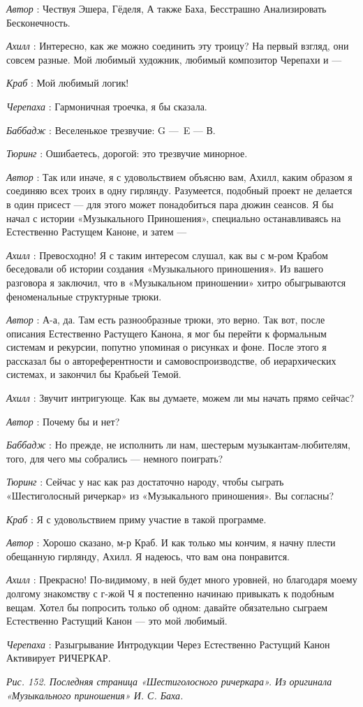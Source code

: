 \documentclass[../main.tex]{subfiles}
\begin{document}
\begin{dialogue}
\emph{Автор} : Чествуя Эшера, Гёделя, А также Баха, Бесстрашно Анализировать Бесконечность.

\emph{Ахилл} : Интересно, как же можно соединить эту троицу? На первый взгляд, они совсем разные. Мой любимый художник, любимый композитор Черепахи и ---

\emph{Краб} : Мой любимый логик!

\emph{Черепаха} : Гармоничная троечка, я бы сказала.

\emph{Баббадж} : Веселенькое трезвучие: G ---~E --- В.

\emph{Тюринг} : Ошибаетесь, дорогой: это трезвучие минорное.

\emph{Автор} : Так или иначе, я с удовольствием объясню вам, Ахилл, каким образом я соединяю всех троих в одну гирлянду. Разумеется, подобный проект не делается в один присест --- для этого может понадобиться пара дюжин сеансов. Я бы начал с истории «Музыкального Приношения», специально останавливаясь на Естественно Растущем Каноне, и затем ---

\emph{Ахилл} : Превосходно! Я с таким интересом слушал, как вы с м-ром Крабом беседовали об истории создания «Музыкального приношения». Из вашего разговора я заключил, что в «Музыкальном приношении» хитро обыгрываются феноменальные структурные трюки.

\emph{Автор} : А-а, да. Там есть разнообразные трюки, это верно. Так вот, после описания Естественно Растущего Канона, я мог бы перейти к формальным системам и рекурсии, попутно упоминая о рисунках и фоне. После этого я рассказал бы о автореферентности и самовоспроизводстве, об иерархических системах, и закончил бы Крабьей Темой.

\emph{Ахилл} : Звучит интригующе. Как вы думаете, можем ли мы начать прямо сейчас?

\emph{Автор} : Почему бы и нет?

\emph{Баббадж} : Но прежде, не исполнить ли нам, шестерым музыкантам-любителям, того, для чего мы собрались --- немного поиграть?

\emph{Тюринг} : Сейчас у нас как раз достаточно народу, чтобы сыграть «Шестиголосный ричеркар» из «Музыкального приношения». Вы согласны?

\emph{Краб} : Я с удовольствием приму участие в такой программе.

\emph{Автор} : Хорошо сказано, м-р Краб. И как только мы кончим, я начну плести обещанную гирлянду, Ахилл. Я надеюсь, что вам она понравится.

\emph{Ахилл} : Прекрасно! По-видимому, в ней будет много уровней, но благодаря моему долгому знакомству с г-жой Ч я постепенно начинаю привыкать к подобным вещам. Хотел бы попросить только об одном: давайте обязательно сыграем Естественно Растущий Канон --- это мой любимый.

\emph{Черепаха} : Разыгрывание Интродукции Через Естественно Растущий Канон Активирует РИЧЕРКАР.

\emph{Рис. 152. Последняя страница «Шестиголосного ричеркара». Из оригинала «Музыкального приношения» И. С. Баха.}

\end{dialogue}
\end{document}
